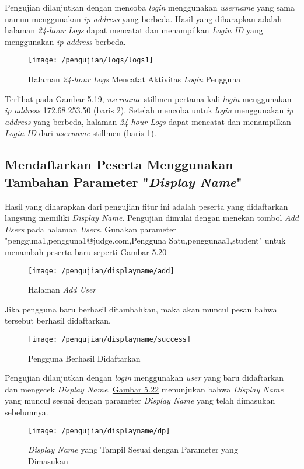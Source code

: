 	Pengujian dilanjutkan dengan mencoba \textit{login} menggunakan \textit{username} yang sama namun menggunakan \textit{ip address} yang berbeda. Hasil yang diharapkan adalah halaman \textit{24-hour Logs} dapat mencatat dan menampilkan \textit{Login ID} yang menggunakan \textit{ip address} berbeda.
	\begin{figure}[H]
		\centering  
		\texttt{[image: /pengujian/logs/logs1]}  
		\caption[Halaman \textit{24-hour Logs} Mencatat Aktivitas \textit{Login} Pengguna]{Halaman \textit{24-hour Logs} Mencatat Aktivitas \textit{Login} Pengguna} 
		\label{fig:logs1} 
	\end{figure}
	Terlihat pada \hyperref[fig:logs1]{Gambar 5.19}, \textit{username} stillmen pertama kali \textit{login} menggunakan \textit{ip address} 172.68.253.50 (baris 2). Setelah mencoba untuk \textit{login} menggunakan \textit{ip address} yang berbeda, halaman \textit{24-hour Logs} dapat mencatat dan menampilkan \textit{Login ID} dari \textit{username} stillmen (baris 1).
	
	\subsection{Mendaftarkan Peserta Menggunakan Tambahan Parameter "\textit{Display Name}"}
	Hasil yang diharapkan dari pengujian fitur ini adalah peserta yang didaftarkan langsung memiliki \textit{Display Name}. Pengujian dimulai dengan menekan tombol \textit{Add Users} pada halaman \textit{Users}. Gunakan parameter "pengguna1,pengguna1@judge.com,Pengguna Satu,penggunaa1,student" untuk menambah peserta baru seperti \hyperref[fig:useradd]{Gambar 5.20}
	\begin{figure}[H]
		\centering  
		\texttt{[image: /pengujian/displayname/add]}  
		\caption[Halaman \textit{Add User}]{Halaman \textit{Add User}} 
		\label{fig:useradd} 
	\end{figure}

	Jika pengguna baru berhasil ditambahkan, maka akan muncul pesan bahwa tersebut berhasil didaftarkan.
	\begin{figure}[H]
		\centering  
		\texttt{[image: /pengujian/displayname/success]}  
		\caption[Pengguna Berhasil Didaftarkan]{Pengguna Berhasil Didaftarkan} 
		\label{fig:success} 
	\end{figure}

	Pengujian dilanjutkan dengan \textit{login} menggunakan \textit{user} yang baru didaftarkan dan mengecek \textit{Display Name}. \hyperref[fig:dp]{Gambar 5.22} menunjukan bahwa \textit{Display Name} yang muncul sesuai dengan parameter \textit{Display Name} yang telah dimasukan sebelumnya.
	\begin{figure}[H]
		\centering  
		\texttt{[image: /pengujian/displayname/dp]}  
		\caption[\textit{Display Name} yang Tampil Sesuai dengan Parameter yang Dimasukan]{\textit{Display Name} yang Tampil Sesuai dengan Parameter yang Dimasukan} 
		\label{fig:dp} 
	\end{figure}

